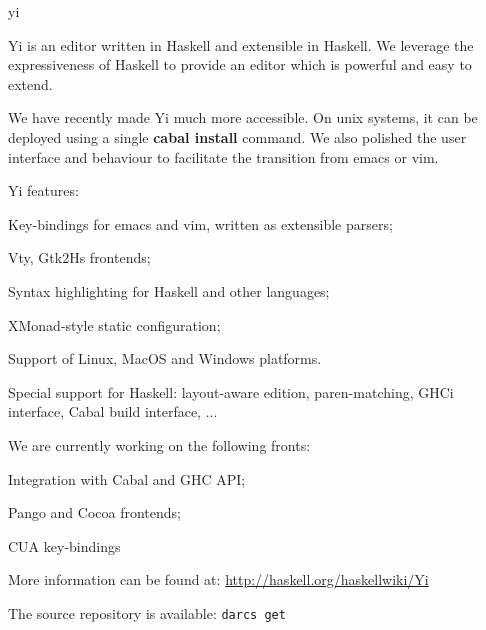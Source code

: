 \begin{hcarentry}[section]{yi}
\label{yi}
\makeheader

Yi is an editor written in Haskell and extensible in Haskell. We leverage the
expressiveness of Haskell to provide an editor which is powerful and easy to
extend.

We have recently made Yi much more accessible. On unix systems, it can be
deployed using a single \textbf{cabal install} command. We also polished the
user interface and behaviour to facilitate the transition from emacs or vim.

Yi features:
\begin{compactitem}
\item Key-bindings for emacs and vim, written as extensible parsers;
\item Vty, Gtk2Hs frontends;
\item Syntax highlighting for Haskell and other languages;
\item XMonad-style static configuration;
\item Support of Linux, MacOS and Windows platforms.
\item Special support for Haskell: layout-aware edition, paren-matching, GHCi interface, Cabal build interface, ...
\end{compactitem}
We are currently working on the following fronts:
\begin{compactitem}
\item Integration with Cabal and GHC API;
\item Pango and Cocoa frontends;
\item CUA key-bindings
\end{compactitem}

\FurtherReading
\begin{compactitem}
\item More information can be found at:
 \url{http://haskell.org/haskellwiki/Yi}

\item The source repository is available:
 \texttt{darcs get}
\end{compactitem}
\end{hcarentry}

